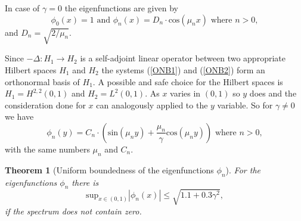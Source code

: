 \documentclass[a4paper,11pt]{article}
\theoremstyle{plain} %
\newtheorem{theorem}{Theorem}[section]
\theoremstyle{definition} %
\theoremstyle{remark} %
\theoremstyle{remark}
\def\Laplace{\Delta}
\begin{document}
In case of $\gamma = 0 $ the eigenfunctions are given by
\begin{equation} \label{ONB2}
\phi_0 (x) = 1 \text{ and } \phi_n (x) = D_n \cdot \mathrm{cos} (\mu_n x) \text{ where } n>0 ,
\end{equation}
and $D_n = \sqrt{2/\mu_n } $.

Since $ -\Laplace : H_1 \rightarrow H_2 $ is a self-adjoint linear operator between two appropriate Hilbert spaces $H_1 $ and  $H_2 $ the systems (\ref{ONB1}) and (\ref{ONB2}) form an orthonormal basis of $H_1$. A possible and safe choice for the Hilbert spaces is $H_1 = H^{2,2} (0,1 ) $ and $H_2 = L^2 (0,1  ) $. 
As $x$ varies in $(0,1)$ so $y$ does and the consideration done for $x$ can analogously applied to the $y$ variable. So for $ \gamma \not= 0 $ we have
\begin{equation}
\phi_n (y) = C_n \cdot \left(\mathrm{sin} (\mu_n y) + \frac{\mu_n }{\gamma } \mathrm{cos} (\mu_n y) \right) \text{ where } n>0 ,
\end{equation}
with the same numbers $\mu_n $ and $C_n $.

\begin{theorem}[Uniform boundedness of the eigenfunctions $\phi_n $] \label{unibound_eigenf}
For the eigenfunctions $\phi_n $ there is 
\begin{equation*}
\mathrm{sup}_{x \in (0,1) } | \phi_n (x)  | \leq \sqrt{1.1 + 0.3\gamma^2 },
\end{equation*}
if the spectrum does not contain zero.
\end{theorem}
\end{document}
